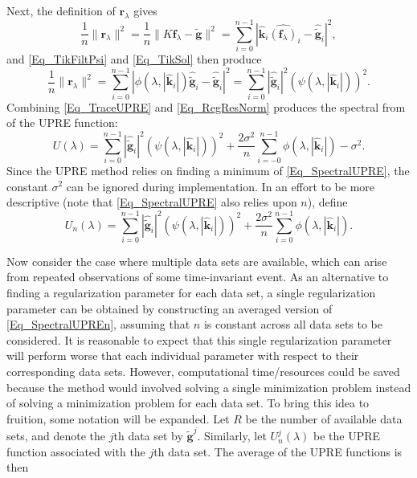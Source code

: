 \documentclass[12pt]{article}
\newcommand{\gnoise}{\widetilde{\mathbf{g}}}
\newcommand{\kdis}{\mathbf{k}}
\newcommand{\kmat}{K}	%
\newcommand{\fdis}{\mathbf{f}}
\newcommand{\regparam}{\lambda}
\newcommand{\freg}{\fdis_{\regparam}}	%
\newcommand{\filt}{\phi}
\newcommand{\mfilt}{\psi}
\newcommand{\noiseSD}{\sigma}	%
\newcommand{\regres}{\mathbf{r}_{\regparam}}	%
\newcommand{\U}{U}	%
\begin{document}
Next, the definition of $\regres$ gives
\[\frac{1}{n}\|\regres\|^2 = \frac{1}{n}\|\kmat\freg - \gnoise\|^2 = \sum_{i = 0}^{n-1} |\widehat{\kdis}_i\widehat{(\freg)}_i - \widehat{\gnoise}_i|^2,\]
and \eqref{Eq_TikFiltPsi} and \eqref{Eq_TikSol} then produce
\begin{equation}
\frac{1}{n}\|\regres\|^2 = \sum_{i = 0}^{n-1} |\filt(\regparam,|\widehat{\kdis}_i|)\widehat{\gnoise}_i - \widehat{\gnoise}_i|^2 = \sum_{i = 0}^{n-1} |\widehat{\gnoise}_i|^2(\mfilt(\regparam,|\widehat{\kdis}_i|))^2.
\label{Eq_RegResNorm}
\end{equation}
Combining \eqref{Eq_TraceUPRE} and \eqref{Eq_RegResNorm} produces the spectral from of the UPRE function:
\begin{equation}
\U(\regparam) = \sum_{i = 0}^{n-1} |\widehat{\gnoise}_i|^2(\mfilt(\regparam,|\widehat{\kdis}_i|))^2 + \frac{2\noiseSD^2}{n}\sum_{i = -0}^{n-1} \filt(\regparam,|\widehat{\kdis}_i|) - \noiseSD^2.
\label{Eq_SpectralUPRE}
\end{equation} 
Since the UPRE method relies on finding a minimum of \eqref{Eq_SpectralUPRE}, the constant $\noiseSD^2$ can be ignored during implementation. In an effort to be more descriptive (note that \eqref{Eq_SpectralUPRE} also relies upon $n$), define
\begin{equation}
\U_n(\regparam) = \sum_{i = 0}^{n-1} |\widehat{\gnoise}_i|^2(\mfilt(\regparam,|\widehat{\kdis}_i|))^2 + \frac{2\noiseSD^2}{n}\sum_{i = 0}^{n-1} \filt(\regparam,|\widehat{\kdis}_i|).
\label{Eq_SpectralUPREn}
\end{equation} \par 
Now consider the case where multiple data sets are available, which can arise from repeated observations of some time-invariant event. As an alternative to finding a regularization parameter for each data set, a single regularization parameter can be obtained by constructing an averaged version of \eqref{Eq_SpectralUPREn}, assuming that $n$ is constant across all data sets to be considered. It is reasonable to expect that this single regularization parameter will perform worse that each individual parameter with respect to their corresponding data sets. However, computational time/resources could be saved because the method would involved solving a single minimization problem instead of solving a minimization problem for each data set. To bring this idea to fruition, some notation will be expanded. Let $R$ be the number of available data sets, and denote the $j$th data set by $\gnoise^j$. Similarly, let $\U_n^j(\regparam)$ be the UPRE function associated with the $j$th data set.  The average of the UPRE functions is then 
\end{document}

